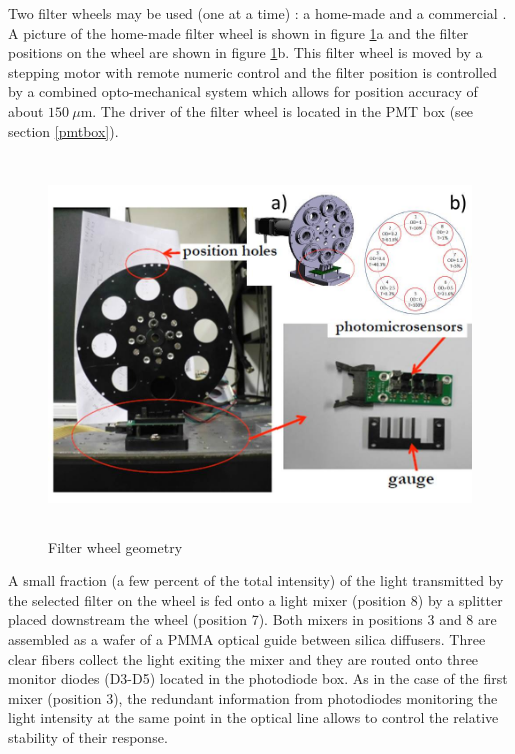 Two filter wheels may be used (one at a time) : a home-made and a commercial \cite{ref:filterwheel}. A picture of the home-made filter wheel is shown in figure \ref{fig:x.3}a and the filter
positions on the wheel are shown in figure \ref{fig:x.3}b. This filter wheel is
moved by a stepping motor with remote numeric control and the filter position is
controlled by a combined opto-mechanical system which allows for 
position accuracy of about  $150 ~\mu$m. The driver of the filter wheel is located
in the PMT box (see section \ref{pmtbox}).
% 
\begin{figure}[htb]
\begin{center} 
\includegraphics[height=10cm]{figures/Filter_wheel}
\caption{Filter wheel geometry
}\label{fig:x.3}
\end{center}
\end{figure}
%

 A small fraction (a few percent of the total intensity) of the light transmitted by
the selected filter on the wheel is fed onto a light mixer (position 8) by a
splitter placed downstream the wheel (position 7). Both mixers in positions 3 and 8
are assembled as a wafer of a PMMA optical guide between silica diffusers.
Three clear fibers collect the light exiting the mixer and they are routed onto
three monitor diodes (D3-D5) located in the photodiode box. As in the case of the
first mixer (position 3), the redundant information from photodiodes monitoring the
light intensity at the same point in the optical line allows to control the relative
stability of their response. 

